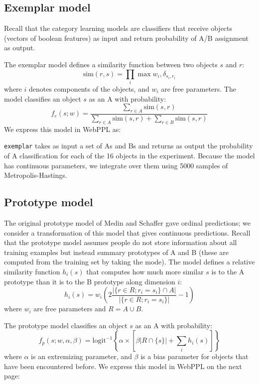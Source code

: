 \documentclass{article}
\begin{document}
\subsection{Exemplar model}

Recall that the category learning models are classifiers that receive objects (vectors of boolean features) as input and return probability of A/B assignment as output.

The exemplar model defines a similarity function between two objects $s$ and $r$:
$$ \text{sim}(r, s) = \prod_i{\max{w_i, \delta_{s_i,r_i}}  }$$
where $i$ denotes components of the objects, and $w_i$ are free parameters.
The model classifies an object $s$ as an A with probability:
$$ f_e(s ; w) = \frac{ \sum\limits_{r \in A}{\text{sim}(s,r)}}{
\sum\limits_{r \in A}{\text{sim}(s,r)} +
\sum\limits_{r \in B}{\text{sim}(s,r)}
 }$$
We express this model in WebPPL as:


\lstinline{exemplar} takes as input a set of As and Bs and returns as output the probability of A classification for each of the 16 objects in the experiment.
Because the model has continuous parameters, we integrate over them using 5000 samples of Metropolis-Hastings.

\subsection{Prototype model}

The original prototype model of Medin and Schaffer gave ordinal predictions; we consider a transformation of this model that gives continuous predictions.
Recall that the prototype model assumes people do not store information about all training examples but instead summary prototypes of A and B (these are computed from the training set by taking the mode).
The model defines a relative similarity function $h_i(s)$ that computes how much more similar $s$ is to the A prototype than it is to the B prototype along dimension $i$:
$$ h_i(s) =  w_i\left(2\frac{|\{r \in R ; r_i = s_i \} \cap A |}{|\{r \in R ; r_i = s_i \}|} - 1\right)$$
where $w_i$ are free parameters and $R = A \cup B$.

The prototype model classifies an object $s$ as an A with probability:
$$ f_p(s ; w, \alpha, \beta) = \mathrm{logit}^{-1}\left\{ \alpha \times \left[ \beta |R \cap \{s\}| + \sum\limits_{i}{h_i(s)} \right] \right\}$$
where $\alpha$ is an extremizing parameter, and $\beta$ is a bias parameter for objects that have been encountered before. We express this model in WebPPL on the next page:

\end{document}
